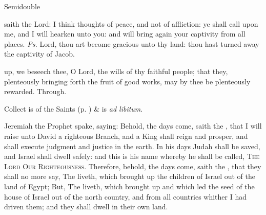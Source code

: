 \begin{inhead}
{Semidouble}
\end{inhead}

\properantiphonfix

\introit
{} saith the Lord: I think thoughts of peace, and not of affliction: ye shall call upon me, and I will hearken unto you: and will bring again your captivity from all places. \textit{Ps.} Lord, thou art become gracious unto thy land: thou hast turned away the captivity of Jacob.

\collect
{} up, we beseech thee, O Lord, the wills of thy faithful people; that they, plenteously bringing forth the fruit of good works, may by thee be plenteously rewarded. Through.
\begin{rubric}
     Collect is of the Saints (p. \pageref{SPSaints}) \&  is \emph{ad libitum}.
\end{rubric}

 Jeremiah the Prophet spake, saying: Behold, the days come, saith the , that I will raise unto David a righteous Branch, and a King shall reign and prosper, and shall execute judgment and justice in the earth. In his days Judah shall be saved, and Israel shall dwell safely: and this is his name whereby he shall be called, \textsc{The Lord Our Righteousness}. Therefore, behold, the days come, saith the , that they shall no more say, The  liveth, which brought up the children of Israel out of the land of Egypt; But, The  liveth, which brought up and which led the seed of the house of Israel out of the north country, and from all countries whither I had driven them; and they shall dwell in their own land.



